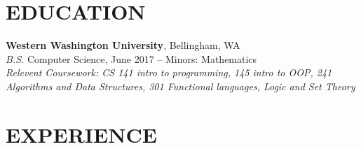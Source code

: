 \documentclass[line,margin]{res}
\begin{document}
\address{360.931.3237 $|$ rainierharvey@gmail.com $|$ https://rainierharvey.me $|$ github.com/euranium}

\begin{resume}

\section{EDUCATION}
	{\bf Western Washington University}, Bellingham, WA \\
	{\sl B.S.} Computer Science, {\small June 2017} -- Minors: Mathematics \\
	{\sl Relevent Coursework: CS 141 {\small intro to programming}, 145 {\small intro to OOP}, 241 {\small Algorithms and Data Structures},
	301 {\small Functional languages, Logic and Set Theory}}

\section{EXPERIENCE}


\end{resume}
\end{document}
